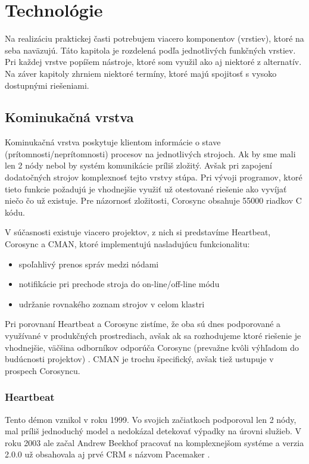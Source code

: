 \chapter{Technológie}
Na realizáciu praktickej časti potrebujem viacero komponentov (vrstiev), ktoré na seba naväzujú. Táto kapitola je rozdelená podľa jednotlivých funkčných vrstiev. Pri každej vrstve popíšem nástroje, ktoré som využil ako aj niektoré z alternatív. Na záver kapitoly zhrniem niektoré termíny, ktoré majú spojitosť s vysoko dostupnými riešeniami.

\section{Kominukačná vrstva}
Kominukačná vrstva poskytuje klientom informácie o stave (prítomnosti/neprítomnosti) procesov na jednotlivých strojoch. Ak by sme mali len 2 nódy nebol by systém komunikácie príliš zložitý. Avšak pri zapojení dodatočných strojov komplexnosť tejto vrstvy stúpa. Pri vývoji programov, ktoré tieto funkcie požadujú je vhodnejšie využiť už otestované riešenie ako vyvíjať niečo čo už existuje. Pre názornosť zložitosti, Corosync obsahuje 55000 riadkov C kódu.

V súčasnosti existuje viacero projektov, z nich si predstavíme Heartbeat, Corosync a CMAN, ktoré implementujú nasladujúcu funkcionalitu:
\begin{itemize}
	\item spoľahlivý prenos správ medzi nódami
	\item notifikácie pri prechode stroja do on-line/off-line módu
	\item udržanie rovnakého zoznam strojov v celom klastri
\end{itemize}

Pri porovnaní Heartbeat a Corosync zistíme, že oba sú dnes podporované a využívané v produkčných prostrediach, avšak ak sa rozhodujeme ktoré riešenie je vhodnejšie, väčšina odborníkov odporúča Corosync (prevažne kvôli výhľadom do budúcnosti projektov) \cite{web:Heartbeat-vs-OpenAIS}. CMAN je trochu špecifický, avšak tiež ustupuje v prospech Corosyncu.

\subsection{Heartbeat}
Tento démon vznikol v roku 1999. Vo svojich začiatkoch podporoval len 2 nódy, mal príliš jednoduchý model a nedokázal detekovať výpadky na úrovni služieb. V roku 2003 ale začal Andrew Beekhof pracovať na komplexnejšom systéme a verzia 2.0.0 už obsahovala aj prvé \ac{CRM} s názvom Pacemaker \cite{web:ClusterLabs}.

